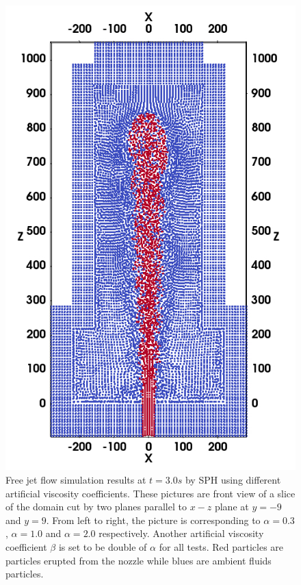 \begin{figure}
\begin{minipage}[t]{.325\textwidth}
        \includegraphics[width=0.99 \textwidth]{Chapter-4/Figures/SPH-alfp3-t3-cutView}
    \end{minipage}%
    \caption{Free jet flow simulation results at $t=3.0 s$ by SPH using different artificial viscosity coefficients. These pictures are front view of a slice of the domain cut by two planes parallel to $x-z$ plane at $y=-9$ and $y=9$. From left to right, the picture is corresponding to $\alpha=0.3$, $\alpha=1.0$ and $\alpha=2.0$ respectively. Another artificial viscosity coefficient $\beta$ is set to be double of $\alpha$ for all tests. Red particles are particles erupted from the nozzle while blues are ambient fluids particles.}
    \label{fig:free-jet-SPH-comparison}
\end{figure}


